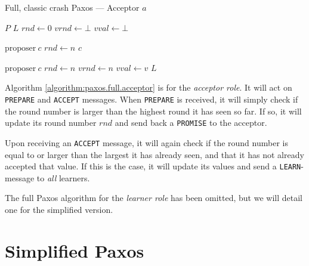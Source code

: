 \begin{algorithm}[H]
  \caption{Full, classic crash Paxos --- Acceptor $a$}
  \label{algorithm:paxos.full.acceptor}
  \begin{algorithmic}
    \State $P$ 
    \State $L$ 
    \State $rnd \gets 0$ 
    \State $vrnd \gets \bot$ 
    \State $vval \gets \bot$ 
    \State

       {$\text{proposer}\ c$} 
         \State $rnd \gets n$
         \State {}
                       {$c$}
      \EndIf
    \EndOn
    \State

       {$\text{proposer}\ c$} 
        \State $rnd \gets n$
        \State $vrnd \gets n$
        \State $vval \gets v$
        \State {}
                      {$L$}
      \EndIf
    \EndOn
  \end{algorithmic}
\end{algorithm}

Algorithm \ref{algorithm:paxos.full.acceptor}
 is for the \textit{acceptor
role}.  It will act on \texttt{PREPARE} and \texttt{ACCEPT} messages.
When \texttt{PREPARE} is received, it will simply check if the round number
is larger than the highest round it has seen so far.  If so, it will update
its round number $rnd$ and send back a \texttt{PROMISE} to the acceptor.

Upon receiving an \texttt{ACCEPT} message, it will again check if the round
number is equal to or larger than the largest it has already seen, and that
it has not already accepted that value.  If this is the case, it will update
its values and send a \texttt{LEARN}-message to \textit{all} learners.

The full Paxos algorithm for the \textit{learner role} has been omitted, but
we will detail one for the simplified version.

\section{Simplified Paxos}
\label{ch:simplifying.paxos}


